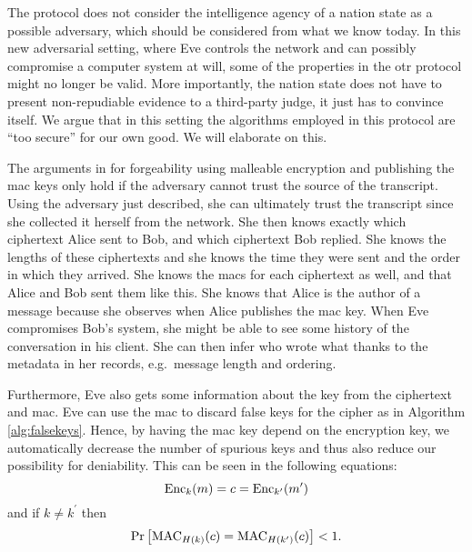 The protocol does not consider the intelligence agency of a nation state as 
a possible adversary, which should be considered from what we know today.
In this new adversarial setting, where Eve controls the network and can 
possibly compromise a computer system at will, some of the properties in the 
\ac{otr} protocol might no longer be valid.
More importantly, the nation state does not have to present non-repudiable 
evidence to a third-party judge, it just has to convince itself.
We argue that in this setting the algorithms employed in this protocol are 
\enquote{too secure} for our own good.
We will elaborate on this.

The arguments in \cite{otr2004} for forgeability using malleable encryption and 
publishing the \ac{mac} keys only hold if the adversary cannot trust the source 
of the transcript.
Using the adversary just described, she can ultimately trust the transcript 
since she collected it herself from the network.
She then knows exactly which ciphertext Alice sent to Bob, and which ciphertext 
Bob replied.
She knows the lengths of these ciphertexts and she knows the time they were 
sent and the order in which they arrived.
She knows the \acp{mac} for each ciphertext as well, and that Alice and Bob 
sent them like this.
She knows that Alice is the author of a message because she observes when Alice 
publishes the \ac{mac} key.
When Eve compromises Bob's system, she might be able to see some history of the 
conversation in his client.
She can then infer who wrote what thanks to the metadata in her records, e.g.\ 
message length and ordering.

Furthermore, Eve also gets some information about the key from the ciphertext 
and \ac{mac}.
Eve can use the \ac{mac} to discard false keys for the cipher as in Algorithm 
\ref{alg:falsekeys}.
Hence, by having the \ac{mac} key depend on the encryption key, we 
automatically decrease the number of spurious keys and thus also reduce our 
possibility for deniability.
This can be seen in the following equations:
\begin{equation*}
  \operatorname{\mathrm{Enc}}_k( m ) = c = \operatorname{\mathrm{Enc}}_{k^\prime}( m^\prime )
\end{equation*}
and if \(k\neq k^\prime\) then
\begin{equation*}
  \Pr\left[
    \operatorname{\mathrm{MAC}}_{H(k)}( c ) = \operatorname{\mathrm{MAC}}_{H(k^\prime)}( c )
  \right] < 1.
\end{equation*}

